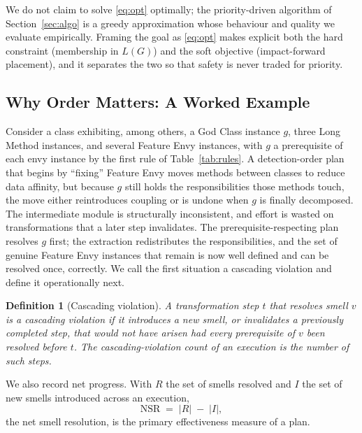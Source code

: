 \documentclass[journal,onecolumn,11pt]{IEEEtran}
\newtheorem{definition}{Definition}
\begin{document}
We do not claim to solve \eqref{eq:opt} optimally; the priority-driven algorithm of Section~\ref{sec:algo} is a greedy approximation whose behaviour and quality we evaluate empirically. Framing the goal as \eqref{eq:opt} makes explicit both the hard constraint (membership in $L(G)$) and the soft objective (impact-forward placement), and it separates the two so that safety is never traded for priority.

\subsection{Why Order Matters: A Worked Example}
Consider a class exhibiting, among others, a God Class instance $g$, three Long Method instances, and several Feature Envy instances, with $g$ a prerequisite of each envy instance by the first rule of Table~\ref{tab:rules}. A detection-order plan that begins by ``fixing'' Feature Envy moves methods between classes to reduce data affinity, but because $g$ still holds the responsibilities those methods touch, the move either reintroduces coupling or is undone when $g$ is finally decomposed. The intermediate module is structurally inconsistent, and effort is wasted on transformations that a later step invalidates. The prerequisite-respecting plan resolves $g$ first; the extraction redistributes the responsibilities, and the set of genuine Feature Envy instances that remain is now well defined and can be resolved once, correctly. We call the first situation a cascading violation and define it operationally next.

\begin{definition}[Cascading violation]
A transformation step $t$ that resolves smell $v$ is a \emph{cascading violation} if it introduces a new smell, or invalidates a previously completed step, that would not have arisen had every prerequisite of $v$ been resolved before $t$. The cascading-violation count of an execution is the number of such steps.
\end{definition}

We also record net progress. With $R$ the set of smells resolved and $I$ the set of new smells introduced across an execution,
\begin{equation}
\label{eq:nsr}
\mathrm{NSR}\;=\;|R|\;-\;|I|,
\end{equation}
the net smell resolution, is the primary effectiveness measure of a plan.

\end{document}
